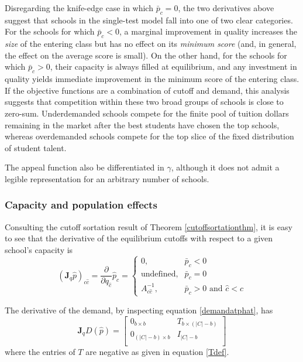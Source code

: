 \documentclass[12pt]{article}
\numberwithin{equation}{subsection}
\theoremstyle{definition}
\begin{document}
Disregarding the knife-edge case in which $\bar p_c = 0$, the two derivatives above suggest that schools in the single-test model fall into one of two clear categories. For the schools for which $\bar p_c < 0$, a marginal improvement in quality increases the \emph{size} of the entering class but has no effect on its \emph{minimum score} (and, in general, the effect on the average score is small). On the other hand, for the schools for which $\bar p_c > 0$, their capacity is always filled at equilibrium, and any investment in quality yields immediate improvement in the minimum score of the entering class. If the objective functions are a combination of cutoff and demand, this analysis suggests that competition within these two broad groups of schools is close to zero-sum. Underdemanded schools compete for the finite pool of tuition dollars remaining in the market after the best students have chosen the top schools, whereas overdemanded schools compete for the top slice of the fixed distribution of student talent.

The appeal function also be differentiated in $\gamma$, although it does not admit a legible representation for an arbitrary number of schools. 


\subsubsection{Capacity and population effects}
Consulting the cutoff sortation result of Theorem \ref{cutoffsortationthm}, it is easy to see that the derivative of the equilibrium cutoffs with respect to a given school's capacity is
\begin{equation}\label{jac-q-p}
\left(\mathbf{J}_q \hat p\right)_{c\hat c} =
\frac{\partial}{\partial q_{\hat c}} \hat p_c = \begin{cases}
0, & \bar p_c < 0 \\
\text{undefined}, & \bar p_c = 0 \\
A^{-1}_{c \hat c}, & \bar p_c > 0 \text{ and }\hat c < c 
\end{cases}
\end{equation}

The derivative of the demand, by inspecting equation \eqref{demandatphat}, has
\begin{equation}\mathbf{J}_q D(\hat p) =
\begin{bmatrix}
0_{b \times b} & T_{b \times (|C| - b)} \\
0_{(|C| - b) \times b} & I_{|C| - b} \\
\end{bmatrix} 
\end{equation}
where the entries of $T$ are negative as given in equation \eqref{Tdef}.
\end{document}

